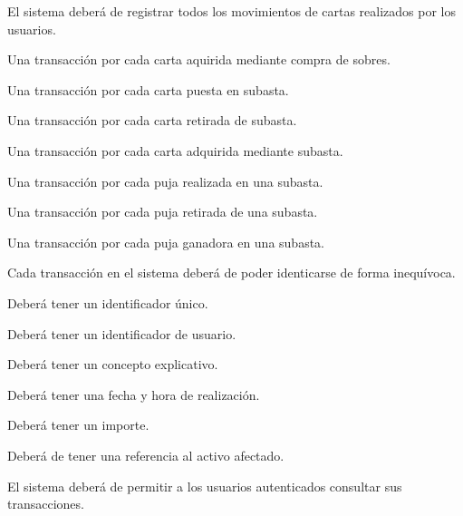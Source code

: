 

\begin{RFTransacciones}
	\item El sistema deberá de registrar todos los movimientos de cartas realizados por los usuarios.
	\begin{RFTransacciones}
		\item Una transacción por cada carta aquirida mediante compra de sobres.
		\item Una transacción por cada carta puesta en subasta.
		\item Una transacción por cada carta retirada de subasta.
		\item Una transacción por cada carta adquirida mediante subasta.
		\item Una transacción por cada puja realizada en una subasta.
		\item Una transacción por cada puja retirada de una subasta.
		\item Una transacción por cada puja ganadora en una subasta.
	\end{RFTransacciones}
	\item Cada transacción en el sistema deberá de poder identicarse de forma inequívoca. \hypertarget{RT-2}{}
	\begin{RFTransacciones}
		\item Deberá tener un identificador único.
		\item Deberá tener un identificador de usuario.
		\item Deberá tener un concepto explicativo.
		\item Deberá tener una fecha y hora de realización.
		\item Deberá tener un importe.
		\item Deberá de tener una referencia al activo afectado.
	\end{RFTransacciones}
	\item El sistema deberá de permitir a los usuarios autenticados consultar sus transacciones.

\end{RFTransacciones}
